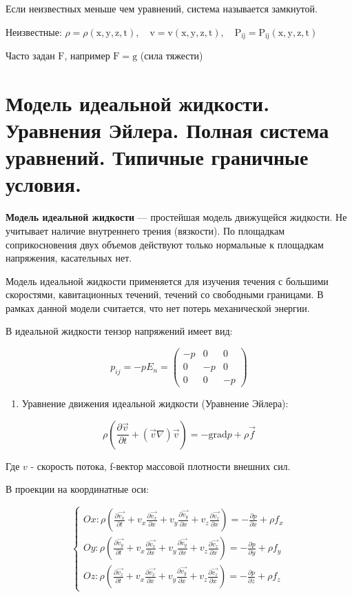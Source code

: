 Если неизвестных меньше чем уравнений, система называется замкнутой.

Неизвестные: $\rho=\rho(\mathrm{x}, \mathrm{y}, \mathrm{z}, \mathrm{t}), \quad \mathrm{v}=\mathrm{v}(\mathrm{x}, \mathrm{y}, \mathrm{z}, \mathrm{t}), \quad \mathrm{P}_{\mathrm{ij}}=\mathrm{P}_{\mathrm{ij}}(\mathrm{x}, \mathrm{y}, \mathrm{z}, \mathrm{t})$

Часто задан $\mathrm{F}$, например $\mathrm{F}=\mathrm{g}$ (сила тяжести)

\section{Модель идеальной жидкости. Уравнения Эйлера. Полная система уравнений. Типичные граничные условия.}
\textbf{Модель идеальной жидкости} --- простейшая модель движущейся жидкости. Не учитывает наличие внутреннего трения (вязкости). По площадкам соприкосновения двух объемов действуют только нормальные к площадкам напряжения, касательных нет.

Модель идеальной жидкости применяется для изучения течения с большими скоростями, кавитационных течений, течений со свободными границами. В рамках данной модели считается, что нет потерь механической энергии.

В идеальной жидкости тензор напряжений имеет вид:

$$
p_{i j}=-p E_{n}=\left(\begin{array}{ccc}
-p & 0 & 0 \\
0 & -p & 0 \\
0 & 0 & -p
\end{array} \right)
$$

\begin{enumerate}
  \item Уравнение движения идеальной жидкости (Уравнение Эйлера):
\end{enumerate}
$$
\rho\left(\frac{\partial \vec{v}}{\partial t}+(\vec{v} \nabla) \vec{v}\right)=-\mathrm{grad} p+\rho \vec{f}
$$

Где $v$ - скорость потока, f-вектор массовой плотности внешних сил.

В проекции на координатные оси:

$$
\left\{\begin{array}{l}
Ox: \rho\left(\frac{\partial \overrightarrow{v_{x}}}{\partial t}+v_{x} \frac{\partial \overrightarrow{v_{x}}}{\partial x}+v_{y} \frac{\partial \overrightarrow{v_{y}}}{\partial x}+v_{z} \frac{\partial \overrightarrow{v_{z}}}{\partial x}\right)=-\frac{\partial p}{\partial x}+\rho f_{x} \\
Oy: \rho\left(\frac{\partial \overrightarrow{v_{y}}}{\partial t}+v_{x} \frac{\partial \overrightarrow{v_{x}}}{\partial x}+v_{y} \frac{\partial \overrightarrow{v_{y}}}{\partial x}+v_{z} \frac{\partial \overrightarrow{v_{z}}}{\partial x}\right)=-\frac{\partial p}{\partial y}+\rho f_{y} \\
Oz: \rho\left(\frac{\partial \overrightarrow{v_{z}}}{\partial t}+v_{x} \frac{\partial \overrightarrow{v_{x}}}{\partial x}+v_{y} \frac{\partial \overrightarrow{v_{y}}}{\partial x}+v_{z} \frac{\partial \overrightarrow{v_{z}}}{\partial x}\right)=-\frac{\partial p}{\partial z}+\rho f_{z}
\end{array}\right.
$$

